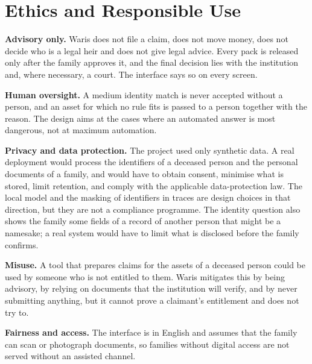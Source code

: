 \section{Ethics and Responsible Use}
\textbf{Advisory only.} Waris does not file a claim, does not move money, does not decide who is a legal heir and does not give legal advice. Every pack is released only after the family approves it, and the final decision lies with the institution and, where necessary, a court. The interface says so on every screen.

\textbf{Human oversight.} A medium identity match is never accepted without a person, and an asset for which no rule fits is passed to a person together with the reason. The design aims at the cases where an automated answer is most dangerous, not at maximum automation.

\textbf{Privacy and data protection.} The project used only synthetic data. A real deployment would process the identifiers of a deceased person and the personal documents of a family, and would have to obtain consent, minimise what is stored, limit retention, and comply with the applicable data-protection law. The local model and the masking of identifiers in traces are design choices in that direction, but they are not a compliance programme. The identity question also shows the family some fields of a record of another person that might be a namesake; a real system would have to limit what is disclosed before the family confirms.

\textbf{Misuse.} A tool that prepares claims for the assets of a deceased person could be used by someone who is not entitled to them. Waris mitigates this by being advisory, by relying on documents that the institution will verify, and by never submitting anything, but it cannot prove a claimant's entitlement and does not try to.

\textbf{Fairness and access.} The interface is in English and assumes that the family can scan or photograph documents, so families without digital access are not served without an assisted channel.

